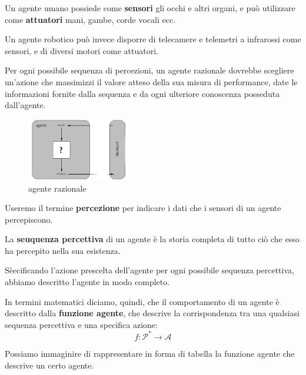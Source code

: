 \documentclass[a4paper, 12pt]{book}
\begin{document}
    Un agente umano possiede come \textbf{sensori} gli occhi e altri organi, e può utilizzare come \textbf{attuatori} mani, gambe, corde vocali ecc.

    Un agente robotico può invece disporre di telecamere e telemetri a infrarossi come sensori, e di diversi motori come attuatori.

    \begin{tcolorbox}[
      colback=cyan!5!white,
      colframe=blue!50!black,
      title=\textbf{Definizione formale di agente razionale},
      coltitle=white,
      fonttitle=\bfseries,
      arc=3mm,
      boxrule=0.5pt,
      enhanced,
      breakable
    ]
      Per ogni possibile sequenza di percezioni, un agente razionale dovrebbe scegliere un’azione che massimizzi il valore atteso della sua misura di performance, date le informazioni fornite dalla sequenza e da ogni ulteriore conoscenza posseduta dall’agente.
    \end{tcolorbox}

    \begin{figure}[h]
      \centering
      \includegraphics[width=0.4\textwidth, keepaspectratio]{foto/agente-ambiente.png}
      \caption{agente razionale}
    \end{figure}

    Useremo il termine \textbf{percezione} per indicare i dati che i sensori di un agente percepiscono.

    La \textbf{seuquenza percettiva} di un agente è la storia completa di tutto ciò che esso ha percepito nella sua esistenza.

    Sèecificando l'azione prescelta dell'agente per ogni possibile sequenza percettiva, abbiamo descritto l'agente in modo completo.

    In termini matematici diciamo, quindi, che il comportamento di un agente è descritto dalla \textbf{funzione agente}, che descrive la corrispondenza tra una qualsiasi sequenza percettiva e una specifica azione:
    \begin{equation*}
      f : \mathcal{P}^{*} \rightarrow \mathcal{A}
    \end{equation*}

    Possiamo immaginire di rappresentare in forma di tabella la funzione agente che descrive un certo agente.
\end{document}
